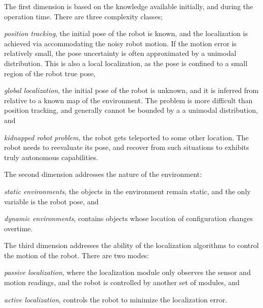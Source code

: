 \documentclass[10pt,journal,compsoc]{IEEEtran}
\begin{document}
The first dimension is based on the knowledge available initially, and during the operation time.  There are three complexity classes; \begin{enumerate*} \item \textit{position tracking}, the initial pose of the robot is known, and the localization is achieved via accommodating the noisy robot motion. If the motion error is relatively small, the pose uncertainty is often approximated by a unimodal distribution.  This is also a local localization, as the pose is confined to a small region of the robot true pose, \item \textit{global localization}, the initial pose of the robot is unknown, and it is inferred from relative to a known map of the environment. The problem is  more difficult than position tracking, and generally cannot be bounded by a a unimodal distribution, and \item \textit{kidnapped robot problem}, the robot gets teleported to some other location. The robot needs to reevaluate its pose, and recover from such situations to exhibits truly autonomous capabilities. \end{enumerate*} 

The second dimension addresses the nature of the environment: \begin{enumerate*} \item \textit{static environments}, the objects in the environment remain static, and the only variable is the robot pose, and \item \textit{dynamic environments}, contains objects whose location of configuration changes overtime.  \end{enumerate*}

The third dimension addresses the ability of the localization algorithms to control the motion of the robot. There are two modes: \begin{enumerate*} \item \textit{passive localization}, where the localization module only observes the sensor and motion readings, and the robot is controlled by another set of modules, and \item \textit{active localization}, controls the robot to minimize the localization error.  \end{enumerate*} 
\end{document}
